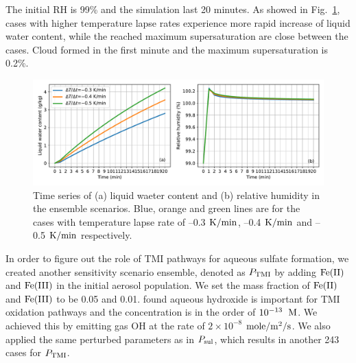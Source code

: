 \documentclass[edeposit,fullpage]{uiucthesis2009}
\makeatletter
\DeclareRobustCommand*\unit[1]
 {\ensuremath{%
   {\thinmuskip3mu\relax
    \def\mu{\text{\textmu}}\def~{\,}%
    \ifx\f@series\testbx\mathbf{#1}\else\mathrm{#1}\fi}}}
\makeatother
\begin{document}
The initial RH is 99\% and the simulation last 20 minutes. As showed in Fig.~\ref{chap2:ensemrh}, cases with higher temperature lapse rates experience more rapid increase of liquid water content, while the reached maximum supersaturation are close between the cases. Cloud formed in the first minute and the maximum supersaturation is 0.2\%. 

\begin{figure}[ht]
    \centering \includegraphics[scale=0.6]{chap2_figs/chap2_mono_lwc_rh.pdf}
    \caption{Time series of (a) liquid waeter content and (b) relative humidity in the ensemble scenarios. Blue, orange and green lines are for the cases with temperature lapse rate of --0.3 \unit{K/min}, --0.4 \unit{K/min} and --0.5 \unit{K/min} respectively.}
    \label{chap2:ensemrh}
\end{figure}

In order to figure out the role of TMI pathways for aqueous sulfate formation, we created another sensitivity scenario ensemble, denoted as $P_{\rm TMI}$ by adding $\rm Fe(II)$ and $\rm Fe(III)$ in the initial aerosol population. We set the mass fraction of $\rm Fe(II)$ and $\rm Fe(III)$ to be 0.05 and 0.01. \citet{deguillaume2004role} found aqueous hydroxide is important for TMI oxidation pathways and the concentration is in the order of $\rm 10^{-13}$~\unit{M}. We achieved this  by emitting gas OH at the rate of $2\times 10^{-8}$ \unit{mole/m^2/s}. We also applied the same perturbed parameters as in $P_{\rm sul}$, which results in another 243 cases for $P_{\rm TMI}$. 
\end{document}
